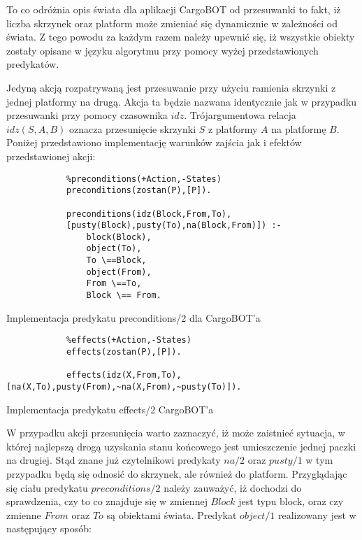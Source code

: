     To co odróżnia opis świata dla aplikacji CargoBOT od przesuwanki to fakt, iż liczba skrzynek oraz platform może zmieniać się dynamicznie w zależności 
    od świata. Z tego powodu za każdym razem należy upewnić się, iż wszystkie obiekty zostały opisane w języku algorytmu przy pomocy wyżej przedstawionych 
    predykatów. 

    Jedyną akcją rozpatrywaną jest przesuwanie przy użyciu ramienia skrzynki z jednej platformy na drugą. Akcja ta będzie nazwana identycznie jak w 
    przypadku przesuwanki przy pomocy czasownika $idz$. Trójargumentowa relacja $idz(S,A,B)$ oznacza przesunięcie skrzynki $S$ z platformy $A$
    na platformę $B$. Poniżej przedstawiono implementację warunków zajścia jak i efektów przedstawionej akcji:

    \begin{listing}[H]
        \begin{verbatim}
            %preconditions(+Action,-States)
            preconditions(zostan(P),[P]).

            preconditions(idz(Block,From,To), 
            [pusty(Block),pusty(To),na(Block,From)]) :-
                block(Block),
                object(To),
                To \==Block,
                object(From),
                From \==To,
                Block \== From.
        \end{verbatim}
    \caption{Implementacja predykatu preconditions/2 dla CargoBOT'a}
    \end{listing}

    \begin{listing}[H]
        \begin{verbatim}
            %effects(+Action,-States)
            effects(zostan(P),[P]).

            effects(idz(X,From,To),[na(X,To),pusty(From),~na(X,From),~pusty(To)]).
        \end{verbatim}
    \caption{Implementacja predykatu effects/2 CargoBOT'a}
    \end{listing}
    W przypadku akcji przesunięcia warto zaznaczyć, iż może zaistnieć sytuacja, w której najlepszą drogą uzyskania stanu końcowego jest 
    umieszczenie jednej paczki na drugiej. Stąd znane już czytelnikowi predykaty $na/2$ oraz $pusty/1$ w tym przypadku będą się odnosić do skrzynek, 
    ale również do platform. Przyglądając się ciału predykatu $preconditions/2$ należy zauważyć, iż dochodzi do sprawdzenia, czy 
    to co znajduje się w zmiennej $Block$ jest typu block, oraz czy zmienne $From$ oraz $To$ są obiektami świata. 
    Predykat $object/1$ realizowany jest w następujący sposób:

